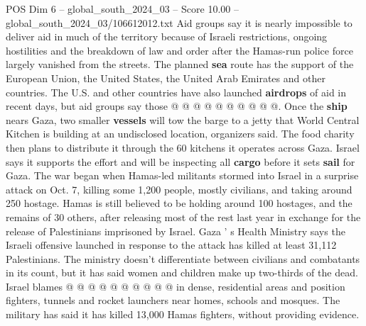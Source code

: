 \begin{textsample}{POS Dim 6 – global\_south\_2024\_03 – Score 10.00 – global\_south\_2024\_03/106612012.txt}
Aid groups say it is nearly impossible to deliver aid in much of the territory because of Israeli restrictions, ongoing hostilities and the breakdown of law and order after the Hamas-run police force largely vanished from the streets.
The planned \textbf{sea} route has the support of the European Union, the United States, the United Arab Emirates and other countries.
The U.S. and other countries have also launched \textbf{airdrops} of aid in recent days, but aid groups say those @ @ @ @ @ @ @ @ @ @.
Once the \textbf{ship} nears Gaza, two smaller \textbf{vessels} will tow the barge to a jetty that World Central Kitchen is building at an undisclosed location, organizers said.
The food charity then plans to distribute it through the 60 kitchens it operates across Gaza.
Israel says it supports the effort and will be inspecting all \textbf{cargo} before it sets \textbf{sail} for Gaza.
The war began when Hamas-led militants stormed into Israel in a surprise attack on Oct. 7, killing some 1,200 people, mostly civilians, and taking around 250 hostage.
Hamas is still believed to be holding around 100 hostages, and the remains of 30 others, after releasing most of the rest last year in exchange for the release of Palestinians imprisoned by Israel.
Gaza ' s Health Ministry says the Israeli offensive launched in response to the attack has killed at least 31,112 Palestinians.
The ministry doesn't differentiate between civilians and combatants in its count, but it has said women and children make up two-thirds of the dead.
Israel blames @ @ @ @ @ @ @ @ @ @ in dense, residential areas and position fighters, tunnels and rocket launchers near homes, schools and mosques.
The military has said it has killed 13,000 Hamas fighters, without providing evidence.

\end{textsample}
